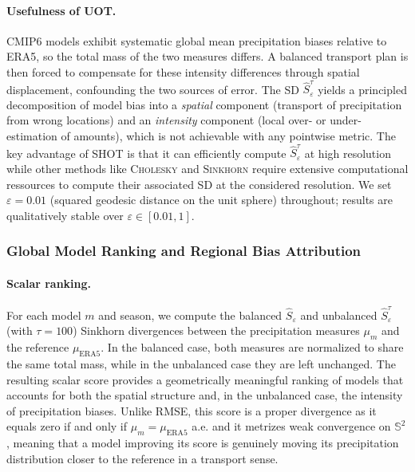 \documentclass{article}
\theoremstyle{plain}
\theoremstyle{definition}
\theoremstyle{remark}
\begin{document}
\paragraph{Usefulness of UOT.}
CMIP6 models exhibit systematic global mean precipitation biases
relative to ERA5, so the total mass of the two measures differs. A
balanced transport plan is then forced to compensate for these
intensity differences through spatial displacement, confounding the
two sources of error. The SD $\hat{S}^\tau_\varepsilon$ yields a
principled decomposition of model bias into a \emph{spatial}
component (transport of precipitation from wrong locations) and an
\emph{intensity} component (local over- or under-estimation of
amounts), which is not achievable with any pointwise metric.
The key advantage of \textsc{SHOT} is that it can efficiently compute $\hat{S}^\tau_\varepsilon$ at high resolution while other methods like \textsc{Cholesky} and \textsc{Sinkhorn} require extensive computational ressources to compute their associated SD at the considered resolution. We set $\varepsilon = 0.01$ (squared geodesic distance on the unit sphere) throughout; results are qualitatively stable over $\varepsilon \in [0.01, 1]$.

\subsubsection{Global Model Ranking and Regional Bias Attribution}
\label{sec:ranking}

\paragraph{Scalar ranking.}
For each model $m$ and season, we compute the balanced $\hat{S}_\varepsilon$ and unbalanced  $\hat{S}^\tau_\varepsilon$ (with $\tau=100$) Sinkhorn
divergences between the precipitation measures $\mu_m$ and the reference $\mu_\mathrm{ERA5}$. In the balanced case, both measures are normalized to share the same total mass, while in the unbalanced case they are left unchanged. The resulting scalar score provides a
geometrically meaningful ranking of models that accounts for both the
spatial structure and, in the unbalanced case, the intensity of precipitation
biases. Unlike RMSE, this score is a proper divergence as it equals zero if and
only if $\mu_m = \mu_\mathrm{ERA5}$ a.e. and it metrizes weak
convergence on $\mathbb{S}^2$, meaning that a model improving its
score is genuinely moving its precipitation distribution closer to
the reference in a transport sense.
\end{document}
